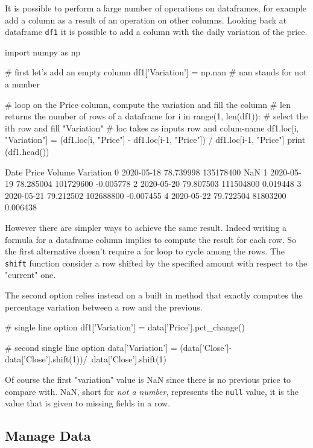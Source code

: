 It is possible to perform a large number of operations on dataframes, for example add a column as a result of an operation on other columns. 
Looking back at dataframe \texttt{df1} it is possible to add a column with the daily variation of the price.

\begin{ipythonnon}
import numpy as np

# first let's add an empty column
df1['Variation'] = np.nan # nan stands for not a number

# loop on the Price column, compute the variation and fill the column
# len returns the number of rows of a dataframe
for i in range(1, len(df1)):
    # select the ith row and fill "Variation"
    # loc takes as inputs row and colum-name
    df1.loc[i, "Variation"] = (df1.loc[i, "Price"] - df1.loc[i-1, "Price"]) /
        df1.loc[i-1, "Price"]
print (df1.head())
\end{ipythonnon}
\begin{ioutput}
        Date      Price     Volume  Variation
0 2020-05-18  78.739998  135178400        NaN
1 2020-05-19  78.285004  101729600  -0.005778
2 2020-05-20  79.807503  111504800   0.019448
3 2020-05-21  79.212502  102688800  -0.007455
4 2020-05-22  79.722504   81803200   0.006438	
\end{ioutput}
\noindent
However there are simpler ways to achieve the same result. Indeed writing a formula for a dataframe column implies to compute the result for each row. So the first alternative doesn't require a for loop to cycle among the rows. The \texttt{shift} function consider a row shifted by the specified amount with respect to the "current" one.

The second option relies instead on a built in method that exactly computes the percentage variation between a row and the previous.

\begin{ipythonnon}
# single line option
df1['Variation'] = data['Price'].pct_change()

# second single line option
data['Variation'] =  (data['Close']-data['Close'].shift(1))/\
                      data['Close'].shift(1)
\end{ipythonnon}

Of course the first "variation" value is NaN since there is no previous price to compare with. NaN, short for \emph{not a number}, represents the \texttt{null} value, it is the value that is given to missing fields in a row. 

\subsection{Manage Data}\label{manage-data}

